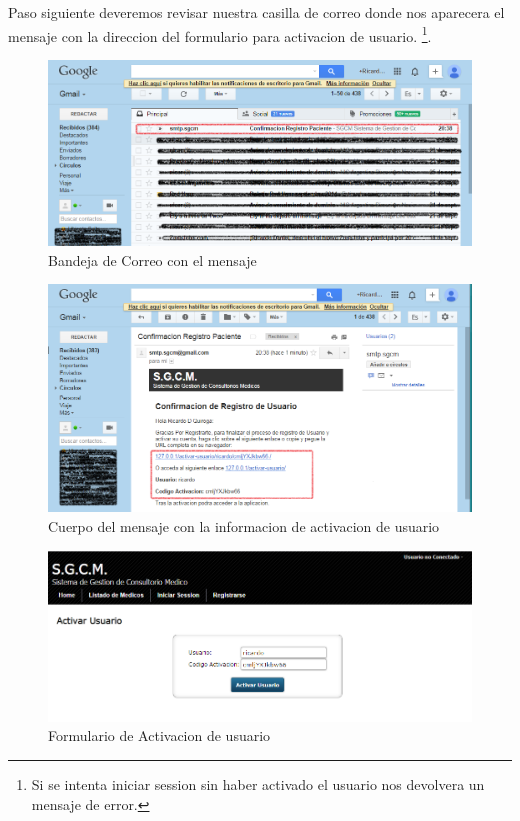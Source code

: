 Paso siguiente deveremos revisar nuestra casilla de correo donde nos aparecera
el mensaje con la direccion del formulario para activacion de usuario.
\footnote{Si se intenta iniciar session sin haber activado el usuario nos devolvera
un mensaje de error.}.

\begin{figure}[H]
    \centering
    \includegraphics[scale=0.5]{resourse/correo-bandeja.png}
    \caption{Bandeja de Correo con el mensaje}
    \label{fig:64}
\end{figure}

\begin{figure}[H]
    \centering
    \includegraphics[scale=0.5]{resourse/correo-mensaje.png}
    \caption{Cuerpo del mensaje con la informacion de activacion de usuario}
    \label{fig:65}
\end{figure}

\begin{figure}[H]
    \centering
    \includegraphics[scale=0.5]{resourse/usuario-activar.png}
    \caption{Formulario de Activacion de usuario}
    \label{fig:66}
\end{figure}

